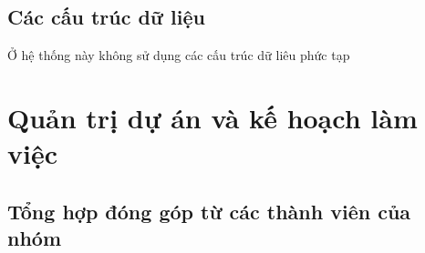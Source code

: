 \documentclass[a4paper, 12pt]{article}
\begin{document}
\subsection{Các cấu trúc dữ liệu}

Ở hệ thống này không sử dụng các cấu trúc dữ liêu phức tạp


\clearpage

\section{Quản trị dự án và kế hoạch làm việc}

\subsection{Tổng hợp đóng góp từ các thành viên của nhóm}
\end{document}
